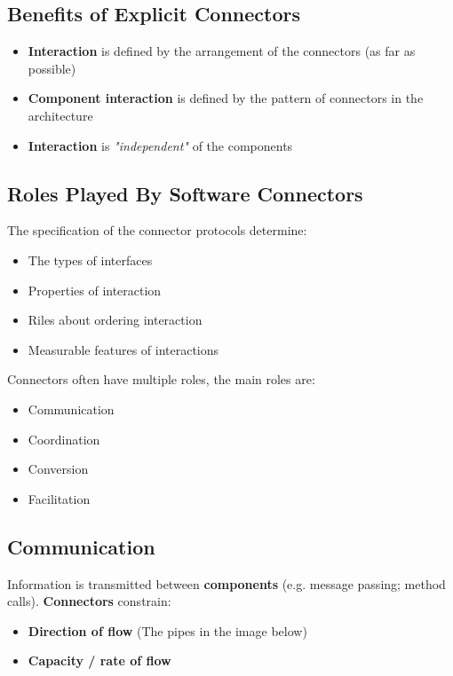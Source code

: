 \documentclass[a4paper]{article}
\begin{document}
\subsection{Benefits of Explicit Connectors}
\begin{itemize}
\item \textbf{Interaction} is defined by the arrangement of the connectors (as far as possible)
\item \textbf{Component interaction} is defined by the pattern of connectors in the architecture
\item \textbf{Interaction} is \textit{"independent"} of the components
\end{itemize}

\subsection{Roles Played By Software Connectors}
The specification of the connector protocols determine:
\begin{itemize}
\item The types of interfaces
\item Properties of interaction
\item Riles about ordering interaction
\item Measurable features of interactions\\
\end{itemize}

Connectors often have multiple roles, the main roles are:
\begin{itemize}
\item Communication
\item Coordination
\item Conversion
\item Facilitation
\end{itemize}

\subsection{Communication}
Information is transmitted between \textbf{components} (e.g. message passing; method calls). \textbf{Connectors} constrain:
\begin{itemize}
\item \textbf{Direction of flow }(The pipes in the image below)
\item \textbf{Capacity / rate of flow}\\
\end{itemize}
\end{document}
